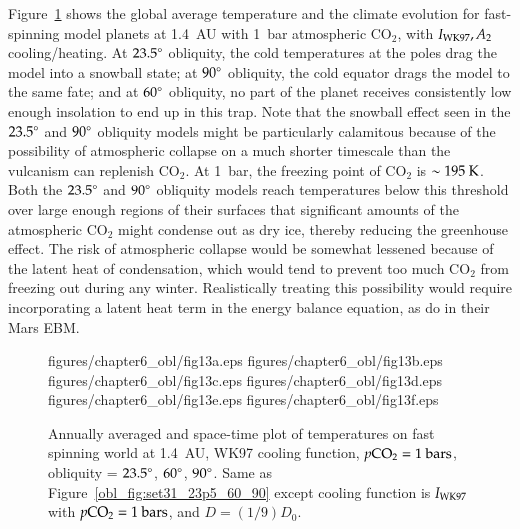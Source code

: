 Figure~\ref{obl_fig:set45_23p5_60_90} shows the global average
temperature and the climate evolution for fast-spinning model planets
at 1.4~AU with 1~bar atmospheric CO$_2$, with $I_{\rm WK97},A_2$
cooling/heating.  At $23.5\degr$ obliquity, the cold temperatures at
the poles drag the model into a snowball state; at $90\degr$
obliquity, the cold equator drags the model to the same fate; and at
$60\degr$ obliquity, no part of the planet receives consistently low
enough insolation to end up in this trap.  Note that the snowball
effect seen in the $23.5\degr$ and $90\degr$ obliquity models might be
particularly calamitous because of the possibility of atmospheric
collapse on a much shorter timescale than the vulcanism can replenish
CO$_2$.  At 1~bar, the freezing point of CO$_2$ is $\sim 195 \rm~K$.
Both the $23.5\degr$ and $90\degr$ obliquity models reach temperatures
below this threshold over large enough regions of their surfaces that
significant amounts of the atmospheric CO$_2$ might condense out as
dry ice, thereby reducing the greenhouse effect.  The risk of
atmospheric collapse would be somewhat lessened because of the latent
heat of condensation, which would tend to prevent too much CO$_2$ from
freezing out during any winter.  Realistically treating this
possibility would require incorporating a latent heat term in the
energy balance equation, as \citet{nakamura+tajika2002} do in their
Mars EBM.




\begin{figure}[p]
\plottwo
{figures/chapter6_obl/fig13a.eps}
{figures/chapter6_obl/fig13b.eps}\\
\plottwo
{figures/chapter6_obl/fig13c.eps}
{figures/chapter6_obl/fig13d.eps}\\
\plottwo
{figures/chapter6_obl/fig13e.eps}
{figures/chapter6_obl/fig13f.eps}
\caption[Annually averaged and space-time plot of temperatures on fast
spinning world at 1.4~AU, WK97 cooling function, $p\rm CO_2 = 1~bars$,
obliquity = $23.5\degr$, $60\degr$, $90\degr$.]{Annually averaged and
space-time plot of temperatures on fast spinning world at 1.4~AU, WK97
cooling function, $p\rm CO_2 = 1~bars$, obliquity = $23.5\degr$,
$60\degr$, $90\degr$.
%
Same as Figure~\ref{obl_fig:set31_23p5_60_90} except cooling function
is $I_{\rm WK97}$ with $p\rm CO_2 = 1~bars$, and $D=(1/9)D_0$.}
\label{obl_fig:set45_23p5_60_90}
\end{figure}

\afterpage{\clearpage}

